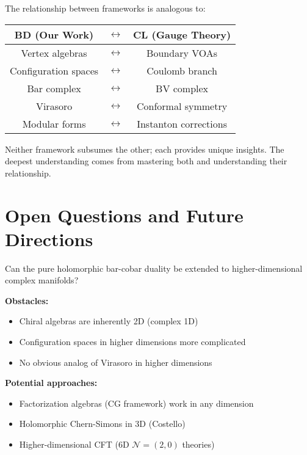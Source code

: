 \begin{remark}\label{rem:complementary-strengths-summary}
The relationship between frameworks is analogous to:

\begin{center}
\begin{tabular}{c|c|c}
\textbf{BD (Our Work)} & $\leftrightarrow$ & \textbf{CL (Gauge Theory)} \\
\hline
Vertex algebras & $\leftrightarrow$ & Boundary VOAs \\
Configuration spaces & $\leftrightarrow$ & Coulomb branch \\
Bar complex & $\leftrightarrow$ & BV complex \\
Virasoro & $\leftrightarrow$ & Conformal symmetry \\
Modular forms & $\leftrightarrow$ & Instanton corrections
\end{tabular}
\end{center}

Neither framework subsumes the other; each provides unique insights. The deepest 
understanding comes from mastering both and understanding their relationship.
\end{remark}


\section{Open Questions and Future Directions}
\label{sec:open-questions-holo-topo}

\begin{question}\label{q:higher-dim}
Can the pure holomorphic bar-cobar duality be extended to higher-dimensional complex 
manifolds?

\textbf{Obstacles:}
\begin{itemize}
\item Chiral algebras are inherently 2D (complex 1D)
\item Configuration spaces in higher dimensions more complicated
\item No obvious analog of Virasoro in higher dimensions
\end{itemize}

\textbf{Potential approaches:}
\begin{itemize}
\item Factorization algebras (CG framework) work in any dimension
\item Holomorphic Chern-Simons in 3D (Costello)
\item Higher-dimensional CFT (6D $\mathcal{N}=(2,0)$ theories)
\end{itemize}
\end{question}

